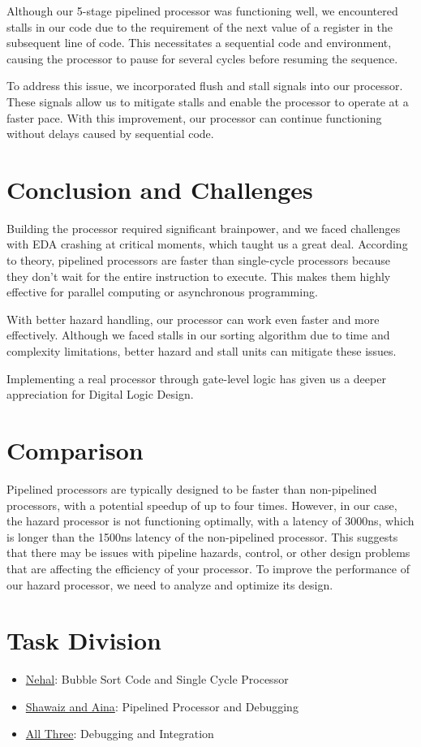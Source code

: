 \documentclass{report}
\begin{document}
Although our 5-stage pipelined processor was functioning well, we encountered stalls in our code due to the requirement of the next value of a register in the subsequent line of code. This necessitates a sequential code and environment, causing the processor to pause for several cycles before resuming the sequence.

To address this issue, we incorporated flush and stall signals into our processor. These signals allow us to mitigate stalls and enable the processor to operate at a faster pace. With this improvement, our processor can continue functioning without delays caused by sequential code.

\chapter{Conclusion and Challenges}

Building the processor required significant brainpower, and we faced challenges with EDA crashing at critical moments, which taught us a great deal. According to theory, pipelined processors are faster than single-cycle processors because they don't wait for the entire instruction to execute. This makes them highly effective for parallel computing or asynchronous programming.

With better hazard handling, our processor can work even faster and more effectively. Although we faced stalls in our sorting algorithm due to time and complexity limitations, better hazard and stall units can mitigate these issues.

Implementing a real processor through gate-level logic has given us a deeper appreciation for Digital Logic Design.

\chapter{Comparison}

Pipelined processors are typically designed to be faster than non-pipelined processors, with a potential speedup of up to four times. However, in our case, the hazard processor is not functioning optimally, with a latency of 3000ns, which is longer than the 1500ns latency of the non-pipelined processor. This suggests that there may be issues with pipeline hazards, control, or other design problems that are affecting the efficiency of your processor. To improve the performance of our hazard processor, we need to analyze and optimize its design.

\chapter{Task Division}
\begin{itemize}
    \item {\large \underline{Nehal}: Bubble Sort Code and Single Cycle Processor}
    \item {\large \underline{Shawaiz and Aina}: Pipelined Processor and Debugging}
    \item {\large \underline{All Three}: Debugging and Integration}
\end{itemize}
\end{document}
